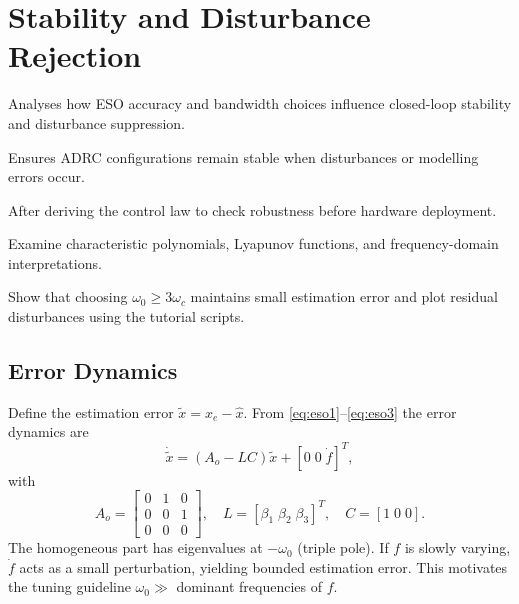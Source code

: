 \section{Stability and Disturbance Rejection}
\begin{beginnerguide}
    \item[\textbf{What?}] Analyses how ESO accuracy and bandwidth choices influence closed-loop stability and disturbance suppression.
    \item[\textbf{Why?}] Ensures ADRC configurations remain stable when disturbances or modelling errors occur.
    \item[\textbf{When?}] After deriving the control law to check robustness before hardware deployment.
    \item[\textbf{How?}] Examine characteristic polynomials, Lyapunov functions, and frequency-domain interpretations.
    \item[\textbf{Example}] Show that choosing $\omega_0 \ge 3\omega_c$ maintains small estimation error and plot residual disturbances using the tutorial scripts.
\end{beginnerguide}
\subsection{Error Dynamics}
Define the estimation error $\tilde{x} = x_e - \hat{x}$. From \eqref{eq:eso1}--\eqref{eq:eso3} the error dynamics are
\begin{equation}
    \dot{\tilde{x}} = (A_o - L C) \tilde{x} + [0\; 0\; \dot{f}]^T,
\end{equation}
with
\begin{equation}
    A_o = \begin{bmatrix} 0 & 1 & 0 \\ 0 & 0 & 1 \\ 0 & 0 & 0 \end{bmatrix}, \quad L = [\beta_1\; \beta_2\; \beta_3]^T, \quad C = [1\; 0\; 0].
\end{equation}
The homogeneous part has eigenvalues at $-\omega_0$ (triple pole). If $f$ is slowly varying, $\dot{f}$ acts as a small perturbation, yielding bounded estimation error. This motivates the tuning guideline $\omega_0 \gg$ dominant frequencies of $f$.

